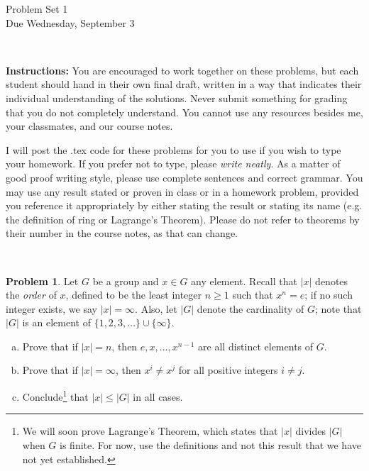 \documentclass[11pt]{article}
\title{}
\date{\vspace{-0.5in}}
\theoremstyle{definition}
\newtheorem{problem}{Problem}
\begin{document}
\thispagestyle{fancy}
\pagestyle{fancy}

\vspace{3em}

\begin{center}
	{\LARGE Problem Set 1 \\}
	Due Wednesday, September 3
\end{center}

\

\noindent
{\bf Instructions:}
You are encouraged to work together on these problems, but each student should hand in their own final draft, written in a way that indicates their individual understanding of the solutions. Never submit something for grading that you do not completely understand. You cannot use any resources besides me, your classmates, and our course notes.


I will post the .tex code for these problems for you to use if you wish to type your homework. If you prefer not to type, please  {\em write neatly}. As a matter of good proof writing style, please use complete sentences and correct grammar. You may use any result stated or proven in class or in a homework problem, provided you reference it appropriately by either stating the result or stating its name (e.g. the definition of ring or Lagrange's Theorem). Please do not refer to theorems by their number in the course notes, as that can change.


\


\begin{problem}
Let $G$ be a group and $x \in G$ any element. 
Recall that $|x|$ denotes the {\em order} of $x$, defined to be the least integer $n \geqslant 1$ such that $x^n = e$; if no such integer exists, we say $|x| = \infty$.
Also, let $|G|$ denote the cardinality of $G$; note that $|G|$ is an element of $\{1, 2, 3, \ldots \} \cup \{\infty\}$.

\begin{enumerate}[(a)]

\item Prove that if $|x| = n$, then $e, x, \dots, x^{n-1}$ are all distinct elements of $G$.

\item Prove that if $|x| = \infty$, then $x^i \neq x^j$ for all positive integers $i \neq j$. 

\item Conclude\footnote{We will soon prove Lagrange's Theorem, which states that $|x|$ divides $|G|$ when $G$ is finite. For now, use the definitions and not this result that we have not yet established.} that $|x| \leqslant |G|$ in all cases. 
\end{enumerate}
\end{problem} 
\end{document}
